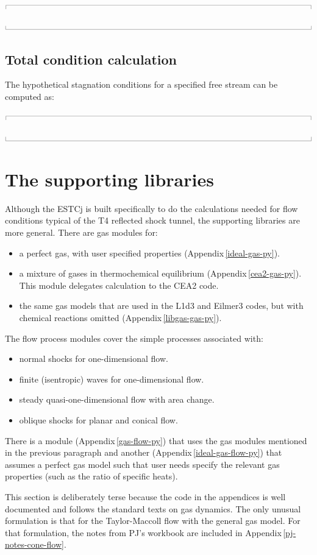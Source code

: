 \documentclass[10pt,a4paper]{article}
\newcommand{\topbar}{\ensuremath{
    \rule{0.1mm}{2.0mm} \rule[2.0mm]{159.5mm}{0.1mm} \rule{0.1mm}{2.0mm}
}}
\newcommand{\bottombar}{\ensuremath{
    \rule{0.1mm}{2.0mm} \rule{159.5mm}{0.1mm} \rule{0.1mm}{2.0mm}
}}
\begin{document}
\medskip
\noindent\topbar

\bottombar

\bigskip
\subsection{Total condition calculation}
%
The hypothetical stagnation conditions for a specified free stream
can be computed as:

\medskip
\noindent\topbar

\bottombar

\newpage
\section{The supporting libraries}
\label{the-libraries}
%
Although the ESTCj is built specifically to do the calculations 
needed for flow conditions typical of the T4 reflected shock tunnel,
the supporting libraries are more general.
There are gas modules for:
\begin{itemize}
 \item a perfect gas, with user specified properties (Appendix\,\ref{ideal-gas-py}).
 \item a mixture of gases in thermochemical equilibrium (Appendix\,\ref{cea2-gas-py}).
   This module delegates calculation to the CEA2 code.
 \item the same gas models that are used in the L1d3 and Eilmer3 codes,
   but with chemical reactions omitted (Appendix\,\ref{libgas-gas-py}).
\end{itemize}
%
The flow process modules cover the simple processes associated with:
\begin{itemize}
 \item normal shocks for one-dimensional flow.
 \item finite (isentropic) waves for one-dimensional flow.
 \item steady quasi-one-dimensional flow with area change.
 \item oblique shocks for planar and conical flow.
\end{itemize}
There is a module (Appendix\,\ref{gas-flow-py}) that uses 
the gas modules mentioned in the previous paragraph
and another (Appendix\,\ref{ideal-gas-flow-py})
that assumes a perfect gas model such that user needs specify the
relevant gas properties (such as the ratio of specific heats).

\medskip
This section is deliberately terse because the code in the appendices is well documented
and follows the standard texts on gas dynamics.
The only unusual formulation is that for the Taylor-Maccoll flow with the general gas model.
For that formulation, the notes from PJ's workbook are included 
in Appendix\,\ref{pj-notes-cone-flow}.
\end{document}
